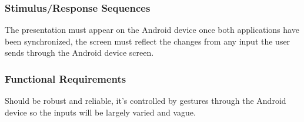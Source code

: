 \documentclass{article}
\begin{document}
\subsubsection{Stimulus/Response Sequences}
The presentation must appear on the Android device once both applications have been synchronized, the screen must reflect the changes from any input the user sends through the Android device screen.
\subsubsection{Functional Requirements}
Should be robust and reliable, it's controlled by gestures through the Android device so the inputs will be largely varied and vague.




\end{document}
